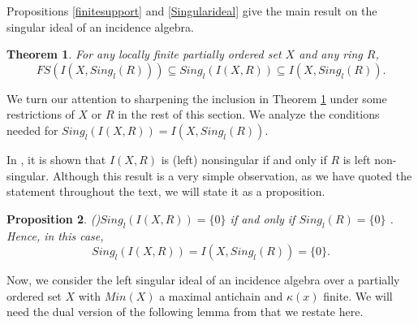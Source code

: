 \documentclass[12pt]{article}
\newtheorem{theorem}{Theorem}[subsection]
\newtheorem{proposition}[theorem]{Proposition}
\begin{document}
\bigskip
Propositions \ref{finitesupport}  and \ref{Singularideal} give the main result on the singular ideal of an incidence algebra.  
\begin{theorem}
\label{SingularMain} For any locally finite partially ordered set $X$ and any ring $R$, 
$$ FS(I(X,Sing_l(R))) \subseteq Sing_l({I(X,R)}) \subseteq I(X,Sing_l(R)).$$
\end{theorem}

\bigskip

We turn our attention to sharpening the inclusion in Theorem \ref{SingularMain} under 
some restrictions of $X$ or $R$ in the rest of this section. We analyze the conditions needed for $Sing_l({I(X,R)}) = I(X,Sing_l(R))$.

In \cite[Theorem 12]{Trio:CharIncAlg}, it is shown that ${I(X,R)}$ is (left)
nonsingular if and only if $R$ is left non-singular. Although this result is a very simple observation, as we have quoted the statement throughout the text, we will state it as a proposition.
\begin{proposition}(\cite[Theorem 12]{Trio:CharIncAlg})\label{Nonsingular} 
$Sing_l({I(X,R)})= 
\{0\}$ if and only if $Sing_l(R)= \{0\}$ . Hence, in this case, 
\begin{equation*}
Sing_l({I(X,R)}) = I(X,Sing_l(R)) = \{0\} .
\end{equation*}
\end{proposition}

\bigskip

Now, we consider the left singular ideal of an incidence algebra over a partially
ordered set $X$ with $Min(X)$ a maximal antichain and $\kappa(x)$ finite. We will need the dual version of the following lemma from \cite{Singh:MaxQuotientIncAlg} that we restate here. 

\end{document}
